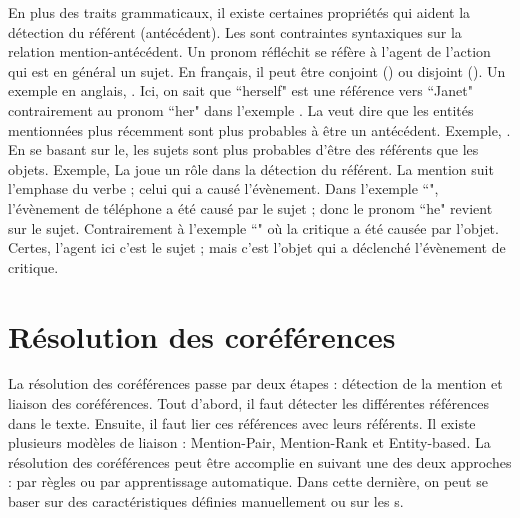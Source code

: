 \documentclass{KodeBook}
\begin{document}
En plus des traits grammaticaux, il existe certaines propriétés qui aident la détection du référent (antécédent).
Les   sont contraintes syntaxiques sur la relation mention-antécédent.
Un pronom réfléchit se réfère à l'agent de l'action qui est en général un sujet. 
En français, il peut être conjoint () ou disjoint ().
Un exemple en anglais, . 
Ici, on sait que ``herself" est une référence vers ``Janet" contrairement au pronom ``her" dans l'exemple .
La  veut dire que les entités mentionnées plus récemment sont plus probables à être un antécédent.
Exemple, .
En se basant sur le, les sujets sont plus probables d'être des référents que les objets. 
Exemple, 
La  joue un rôle dans la détection du référent. 
La mention suit l'emphase du verbe ; celui qui a causé l'évènement.
Dans l'exemple ``", l'évènement de téléphone a été causé par le sujet ; donc le pronom ``he" revient sur le sujet. 
Contrairement à l'exemple ``" où la critique a été causée par l'objet. 
Certes, l'agent ici c'est le sujet ; mais c'est l'objet qui a déclenché l'évènement de critique.

\section{Résolution des coréférences}

La résolution des coréférences passe par deux étapes : détection de la mention et liaison des coréférences. 
Tout d'abord, il faut détecter les différentes références dans le texte. 
Ensuite, il faut lier ces références avec leurs référents.
Il existe plusieurs modèles de liaison : Mention-Pair, Mention-Rank et Entity-based.
La résolution des coréférences peut être accomplie en suivant une des deux approches : par règles ou par apprentissage automatique. 
Dans cette dernière, on peut se baser sur des caractéristiques définies manuellement ou sur les s.
\end{document}
